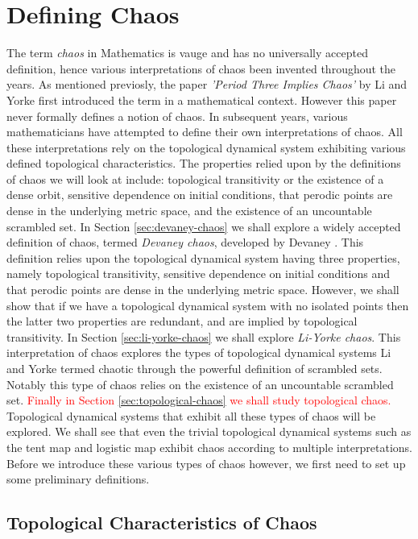 \documentclass[11pt,a4paper,oneside]{memoir}
\theoremstyle{plain}
\theoremstyle{definition}
\begin{document}
\chapter{Defining Chaos} \label{chap:defining-chaos}
The term \emph{chaos} in Mathematics is vauge and has no universally accepted definition, hence various interpretations of chaos been invented throughout the years. As mentioned previosly, the paper \emph{'Period Three Implies Chaos'} by Li and Yorke \cite{li-yorke} first introduced the term in a mathematical context. However this paper never formally defines a notion of chaos. In subsequent years, various mathematicians have attempted to define their own interpretations of chaos. All these interpretations rely on the topological dynamical system exhibiting various defined topological characteristics. The properties relied upon by the definitions of chaos we will look at include: topological transitivity or the existence of a dense orbit, sensitive dependence on initial conditions, that perodic points are dense in the underlying metric space, and the existence of an uncountable scrambled set. In Section \ref{sec:devaney-chaos} we shall explore a widely accepted definition of chaos, termed \emph{Devaney chaos}, developed by Devaney \cite{devaney}. This definition relies upon the topological dynamical system having three properties, namely topological transitivity, sensitive dependence on initial conditions and that perodic points are dense in the underlying metric space. However, we shall show that if we have a topological dynamical system with no isolated points then the latter two properties are redundant, and are implied by topological transitivity. In Section \ref{sec:li-yorke-chaos} we shall explore \emph{Li-Yorke chaos}. This interpretation of chaos explores the types of topological dynamical systems Li and Yorke termed chaotic through the powerful definition of scrambled sets. Notably this type of chaos relies on the existence of an uncountable scrambled set. \textcolor{red}{Finally in Section \ref{sec:topological-chaos} we shall study topological chaos.} Topological dynamical systems that exhibit all these types of chaos will be explored. We shall see that even the trivial topological dynamical systems such as the tent map and logistic map exhibit chaos according to multiple interpretations. Before we introduce these various types of chaos however, we first need to set up some preliminary definitions.

\section{Topological Characteristics of Chaos} \label{sec:characteristics-of-chaos}
\end{document}
